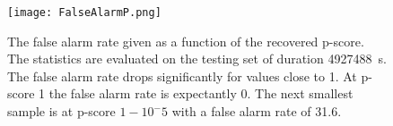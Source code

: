 \begin{figure}
\centering
\texttt{[image: FalseAlarmP.png]}
\caption[False alarm rate for p-score]{The false alarm rate given as a function of the recovered p-score. The statistics are evaluated on the testing set of duration \SI{4927488}{\s}. The false alarm rate drops significantly for values close to 1. At p-score 1 the false alarm rate is expectantly 0. The next smallest sample is at p-score $1-10^-5$ with a false alarm rate of 31.6.}
\end{figure}

